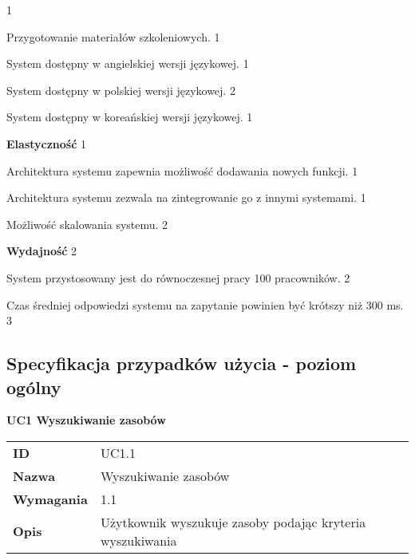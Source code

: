 \begin{myEnumerate}
\begin{myEnumerate}
                  \hfill 1
		\item Przygotowanie materiałów szkoleniowych.
                  \hfill 1
		\item System dostępny w angielskiej wersji językowej.
                  \hfill 1
                \item System dostępny w polskiej wersji językowej.
                  \hfill 2
                \item System dostępny w koreańskiej wersji językowej.
                  \hfill 1
	\end{myEnumerate}
	\item \textbf{Elastyczność}
                  \hfill 1
	\begin{myEnumerate}
		\item Architektura systemu zapewnia możliwość dodawania nowych funkcji.
                  \hfill 1
		\item Architektura systemu zezwala na zintegrowanie go z innymi systemami.
                  \hfill 1
		\item Możliwość skalowania systemu.
                  \hfill 2
	\end{myEnumerate}
	\item \textbf{Wydajność}
                  \hfill 2
	\begin{myEnumerate}
		\item System przystosowany jest do równoczesnej pracy 100 pracowników.
                  \hfill 2
		\item Czas średniej odpowiedzi systemu na zapytanie powinien być krótszy niż 300 ms.
                  \hfill 3
	\end{myEnumerate}
\end{myEnumerate}

\subsection{Specyfikacja przypadków użycia - poziom ogólny}

\vspace{.03\textheight}
\begin{center}
  {\Large\bf UC1 Wyszukiwanie zasobów} \\
\end{center}

\vspace{.02\textheight}

\begin{tabular}{p{}p{}}
\hfill {\bf ID} & UC1.1 \\
\hfill {\bf Nazwa} & Wyszukiwanie zasobów \\
\hfill {\bf Wymagania} & 1.1 \\
\hfill {\bf Opis} & Użytkownik wyszukuje zasoby podając kryteria wyszukiwania \\
\end{tabular}


